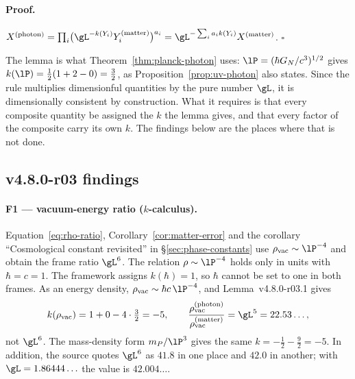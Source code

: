 \paragraph{Proof.}
\(X^{(\mathrm{photon})}=\prod_i\bigl(\gL^{-k(Y_i)}Y_i^{(\mathrm{matter})}\bigr)^{a_i}
=\gL^{-\sum_i a_ik(Y_i)}X^{(\mathrm{matter})}\).  \(\square\)

The lemma is what Theorem~\ref{thm:planck-photon} uses: \(\lP=(\hbar G_N/c^3)^{1/2}\) gives
\(k(\lP)=\tfrac12(1+2-0)=\tfrac32\), as Proposition~\ref{prop:uv-photon} also states.  Since
the rule multiplies dimensionful quantities by the pure number \(\gL\), it is dimensionally
consistent by construction.  What it requires is that every composite quantity be assigned
the \(k\) the lemma gives, and that every factor of the composite carry its own \(k\).  The
findings below are the places where that is not done.

\subsection*{v4.8.0-r03 findings}
\label{subsec:v480-r03-findings}

\paragraph{F1 --- vacuum-energy ratio (\(k\)-calculus).}
Equation~\eqref{eq:rho-ratio}, Corollary~\ref{cor:matter-error} and the corollary
``Cosmological constant revisited'' in \S\ref{sec:phase-constants} use
\(\rho_{\mathrm{vac}}\sim\lP^{-4}\) and obtain the frame ratio \(\gL^{6}\).  The relation
\(\rho\sim\lP^{-4}\) holds only in units with \(\hbar=c=1\).  The framework assigns
\(k(\hbar)=1\), so \(\hbar\) cannot be set to one in both frames.  As an energy density,
\(\rho_{\mathrm{vac}}\sim\hbar c\,\lP^{-4}\), and Lemma~v4.8.0-r03.1 gives
\[
k(\rho_{\mathrm{vac}})=1+0-4\cdot\tfrac32=-5,
\qquad
\frac{\rho_{\mathrm{vac}}^{(\mathrm{photon})}}{\rho_{\mathrm{vac}}^{(\mathrm{matter})}}=\gL^{5}=22.53\ldots,
\]
not \(\gL^{6}\).  The mass-density form \(m_P/\lP^{3}\) gives the same \(k=-\tfrac12-\tfrac92=-5\).
In addition, the source quotes \(\gL^{6}\) as \(41.8\) in one place and \(42.0\) in another;
with \(\gL=1.86444\ldots\) the value is \(42.004\ldots\).

